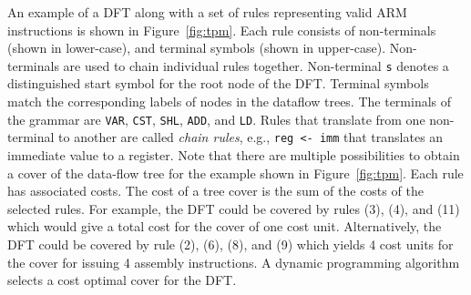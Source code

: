 An example of a DFT along with a set of rules representing valid ARM
instructions is shown in Figure~\ref{fig:tpm}. Each rule consists of
non-terminals (shown in lower-case), and terminal symbols (shown in
upper-case). Non-terminals are used to chain individual rules together.
Non-terminal \texttt{s} denotes a distinguished start symbol for the
root node of the DFT. Terminal symbols match the corresponding labels
of nodes in the dataflow trees. The terminals of the grammar are
\texttt{VAR}, \texttt{CST}, \texttt{SHL}, \texttt{ADD}, and
\texttt{LD}.  Rules that translate from one non-terminal to another are
called \emph{chain rules}, e.g., \texttt{reg <- imm} that translates
an immediate value to a register. Note that there are multiple
possibilities to obtain a cover of the data-flow tree for the example
shown in Figure~\ref{fig:tpm}.  Each rule has associated costs. The
cost of a tree cover is the sum of the costs of the selected
rules. For example, the DFT could be covered by rules (3), (4), and
(11) which would give a total cost for the cover of one cost
unit. Alternatively, the DFT could be covered by rule (2), (6), (8),
and (9) which yields 4 cost units for the cover for issuing 4 assembly
instructions. A dynamic programming algorithm selects a cost optimal
cover for the DFT.

